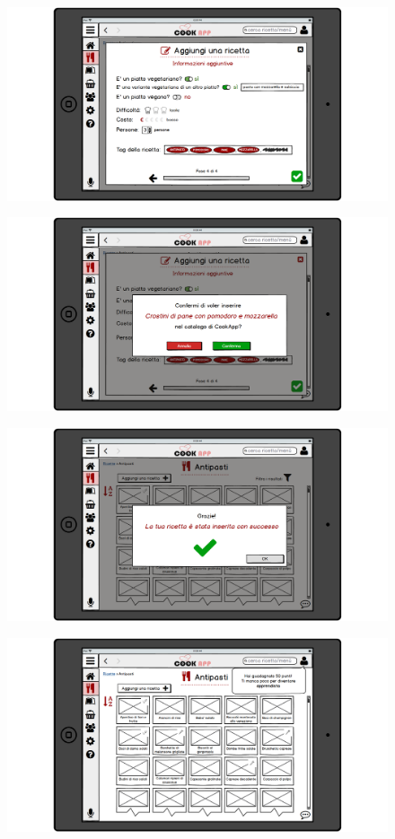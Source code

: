 \begin{figure}[H]
	\centering
	\includegraphics[width=0.95\linewidth]{img/mockup/Aggiungi-ricetta6.png}
\end{figure}
\begin{figure}[H]
	\centering
	\includegraphics[width=0.95\linewidth]{img/mockup/Aggiungi-ricetta7.png}
\end{figure}
\begin{figure}[H]
	\centering
	\includegraphics[width=0.95\linewidth]{img/mockup/Aggiungi-ricetta8.png}
\end{figure}
\begin{figure}[H]
	\centering
	\includegraphics[width=0.95\linewidth]{img/mockup/Aggiungi-ricetta9.png}
\end{figure}


